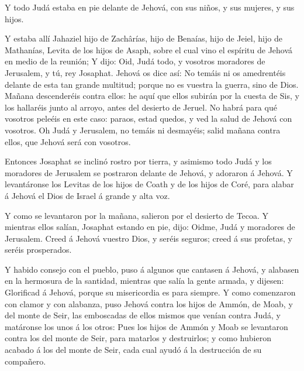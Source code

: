  Y todo Judá estaba en pie delante de Jehová, con sus
niños, y sus mujeres, y sus hijos.

 Y estaba allí Jahaziel hijo de Zachârías, hijo de Benaías,
hijo de Jeiel, hijo de Mathanías, Levita de los hijos de Asaph, sobre el
cual vino el espíritu de Jehová en medio de la reunión;  Y
dijo: Oid, Judá todo, y vosotros moradores de Jerusalem, y tú, rey
Josaphat. Jehová os dice así: No temáis ni os amedrentéis delante de
esta tan grande multitud; porque no es vuestra la guerra, sino de Dios.
 Mañana descenderéis contra ellos: he aquí que ellos
subirán por la cuesta de Sis, y los hallaréis junto al arroyo, antes del
desierto de Jeruel.  No habrá para qué vosotros peleéis en
este caso: paraos, estad quedos, y ved la salud de Jehová con vosotros.
Oh Judá y Jerusalem, no temáis ni desmayéis; salid mañana contra ellos,
que Jehová será con vosotros.

 Entonces Josaphat se inclinó rostro por tierra, y asimismo
todo Judá y los moradores de Jerusalem se postraron delante de Jehová, y
adoraron á Jehová.  Y levantáronse los Levitas de los hijos
de Coath y de los hijos de Coré, para alabar á Jehová el Dios de Israel
á grande y alta voz.

 Y como se levantaron por la mañana, salieron por el
desierto de Tecoa. Y mientras ellos salían, Josaphat estando en pie,
dijo: Oidme, Judá y moradores de Jerusalem. Creed á Jehová vuestro Dios,
y seréis seguros; creed á sus profetas, y seréis prosperados.

 Y habido consejo con el pueblo, puso á algunos que
cantasen á Jehová, y alabasen en la hermosura de la santidad, mientras
que salía la gente armada, y dijesen: Glorificad á Jehová, porque su
misericordia es para siempre.  Y como comenzaron con clamor
y con alabanza, puso Jehová contra los hijos de Ammón, de Moab, y del
monte de Seir, las emboscadas de ellos mismos que venían contra Judá, y
matáronse los unos á los otros:  Pues los hijos de Ammón y
Moab se levantaron contra los del monte de Seir, para matarlos y
destruirlos; y como hubieron acabado á los del monte de Seir, cada cual
ayudó á la destrucción de su compañero.

